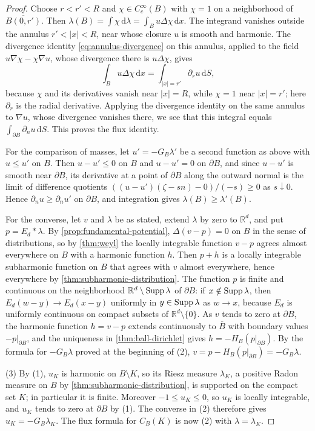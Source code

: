 \begin{proof}
Choose $r<r'<R$ and $\chi\in C_c^\infty(B)$ with $\chi=1$ on a neighborhood of $\overline{B(0,r')}$. Then $\lambda(B)=\int\chi\,\mathrm d\lambda=\int_Bu\Delta\chi\,\mathrm d x$. The integrand vanishes outside the annulus $r'<|x|<R$, near whose closure $u$ is smooth and harmonic. The divergence identity \eqref{eq:annulus-divergence} on this annulus, applied to the field $u\nabla\chi-\chi\nabla u$, whose divergence there is $u\Delta\chi$, gives
\[
 \int_Bu\Delta\chi\,\mathrm d x=\int_{|x|=r'}\partial_ru\,\mathrm d S,
\]
because $\chi$ and its derivatives vanish near $|x|=R$, while $\chi=1$ near $|x|=r'$; here $\partial_r$ is the radial derivative. Applying the divergence identity on the same annulus to $\nabla u$, whose divergence vanishes there, we see that this integral equals $\int_{\partial B}\partial_nu\,\mathrm dS$. This proves the flux identity.

For the comparison of masses, let $u'=-G_B\lambda'$ be a second function as above with $u\leq u'$ on $B$. Then $u-u'\leq0$ on $B$ and $u-u'=0$ on $\partial B$, and since $u-u'$ is smooth near $\partial B$, its derivative at a point of $\partial B$ along the outward normal is the limit of difference quotients $((u-u')(\zeta-sn)-0)/(-s)\geq0$ as $s\downarrow0$. Hence $\partial_nu\geq\partial_nu'$ on $\partial B$, and integration gives $\lambda(B)\geq\lambda'(B)$.

For the converse, let $v$ and $\lambda$ be as stated, extend $\lambda$ by zero to $\mathbb R^d$, and put $p=E_d*\lambda$. By \cref{prop:fundamental-potential}, $\Delta(v-p)=0$ on $B$ in the sense of distributions, so by \cref{thm:weyl} the locally integrable function $v-p$ agrees almost everywhere on $B$ with a harmonic function $h$. Then $p+h$ is a locally integrable subharmonic function on $B$ that agrees with $v$ almost everywhere, hence everywhere by \cref{thm:subharmonic-distribution}. The function $p$ is finite and continuous on the neighborhood $\mathbb R^d\setminus\operatorname{Supp}\lambda$ of $\partial B$: if $x\notin\operatorname{Supp}\lambda$, then $E_d(w-y)\to E_d(x-y)$ uniformly in $y\in\operatorname{Supp}\lambda$ as $w\to x$, because $E_d$ is uniformly continuous on compact subsets of $\mathbb R^d\setminus\{0\}$. As $v$ tends to zero at $\partial B$, the harmonic function $h=v-p$ extends continuously to $\overline B$ with boundary values $-p|_{\partial B}$, and the uniqueness in \cref{thm:ball-dirichlet} gives $h=-H_B(p|_{\partial B})$. By the formula for $-G_B\lambda$ proved at the beginning of (2), $v=p-H_B(p|_{\partial B})=-G_B\lambda$.

(3) By (1), $u_K$ is harmonic on $B\setminus K$, so its Riesz measure $\lambda_K$, a positive Radon measure on $B$ by \cref{thm:subharmonic-distribution}, is supported on the compact set $K$; in particular it is finite. Moreover $-1\leq u_K\leq0$, so $u_K$ is locally integrable, and $u_K$ tends to zero at $\partial B$ by (1). The converse in (2) therefore gives $u_K=-G_B\lambda_K$. The flux formula for $C_B(K)$ is now (2) with $\lambda=\lambda_K$.
\end{proof}

